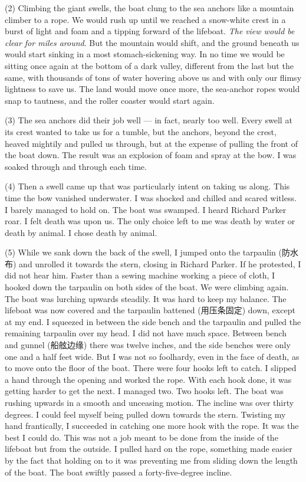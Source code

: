 \documentclass[UTF8,11pt]{ctexart}
\begin{document}
(2) Climbing the giant swells, the boat clung to the sea anchors like a mountain climber to a rope. We would rush up until we reached a snow-white crest in a burst of light and foam and a tipping forward of the lifeboat. \textit{The} \textit{view would be clear for miles around}. But the mountain would shift, and the ground beneath us would start sinking in a most stomach-sickening way. In no time we would be sitting once again at the bottom of a dark valley, different from the last but the same, with thousands of tons of water hovering above us and with only our flimsy lightness to save us. The land would move once more, the sea-anchor ropes would snap to tautness, and the roller coaster would start again.


(3) The sea anchors did their job well — in fact, nearly too well. Every swell at its crest wanted to take us for a tumble, but the anchors, beyond the crest, heaved mightily and pulled us through, but at the expense of pulling the front of the boat down. The result was an explosion of foam and spray at the bow. I was soaked through and through each time.


(4) Then a swell came up that was particularly intent on taking us along. This time the bow vanished underwater. I was shocked and chilled and scared witless. I barely managed to hold on. The boat was swamped. I heard Richard Parker roar. I felt death was upon us. The only choice left to me was death by water or death by animal. I chose death by animal.


(5) While we sank down the back of the swell, I jumped onto the tarpaulin (防水布) and unrolled it towards the stern, closing in Richard Parker. If he protested, I did not hear him. Faster than a sewing machine working a piece of cloth, I hooked down the tarpaulin on both sides of the boat. We were climbing again. The boat was lurching upwards steadily. It was hard to keep my balance. The lifeboat was now covered and the tarpaulin battened (用压条固定) down, except at my end. I squeezed in between the side bench and the tarpaulin and pulled the remaining tarpaulin over my head. I did not have much space. Between bench and gunnel (船舷边缘) there was twelve inches, and the side benches were only one and a half feet wide. But I was not so foolhardy, even in the face of death, as to move onto the floor of the boat. There were four hooks left to catch. I slipped a hand through the opening and worked the rope. With each hook done, it was getting harder to get the next. I managed two. Two hooks left. The boat was rushing upwards in a smooth and unceasing motion. The incline was over thirty degrees. I could feel myself being pulled down towards the stern. Twisting my hand frantically, I succeeded in catching one more hook with the rope. It was the best I could do. This was not a job meant to be done from the inside of the lifeboat but from the outside. I pulled hard on the rope, something made easier by the fact that holding on to it was preventing me from sliding down the length of the boat. The boat swiftly passed a forty-five-degree incline.
\end{document}
